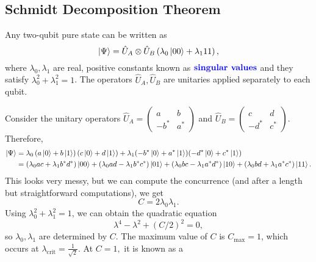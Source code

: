 \documentclass{article}
\numberwithin{equation}{section}
\begin{document}
\subsection{Schmidt Decomposition Theorem}
\begin{theorem}
    Any two-qubit pure state can be written as
    \begin{equation}
        \ket\Psi = \hat{U}_A \otimes \hat{U}_B \left(\lambda_0 \ket{00} + \lambda_1{11}\right),
    \end{equation}
    where $\lambda_0,\lambda_1$ are real, positive constants known as $\textbf{\textcolor{blue}{singular values}}$ and they satisfy $\lambda_0^2 + \lambda_1^2 = 1$. The operators $\hat{U}_A,\hat{U}_B$ are unitaries applied separately to each qubit.
\end{theorem}
Consider the unitary operators $\hat{U}_A = \begin{pmatrix}
    a & b \\ -b^* & a^*
\end{pmatrix}$ and $\hat{U}_B = \begin{pmatrix}
    c &d \\ -d^* & c^*
\end{pmatrix}.$ Therefore,
\begin{align}
    \ket\Psi &= \lambda_0\left(a\ket 0 + b\ket 1\right)(c\ket 0 + d\ket 1) + \lambda_1(-b^*\ket 0 + a^* \ket 1)(-d^*\ket 0 + c^*\ket 1) \\ 
    &= (\lambda_0 ac + \lambda_1 b^* d^*) \ket{00} + (\lambda_0 ad - \lambda_1 b^*c^*) \ket{01} + (\lambda_0 bc-\lambda_1a^*d^*)\ket{10} + (\lambda_0bd+\lambda_1a^*c^*)\ket{11}.
\end{align}
This looks very messy, but we can compute the concurrence (and after a length but straightforward computations), we get
\begin{equation}
    C = 2\lambda_0\lambda_1.
\end{equation}
Using $\lambda_0^2+\lambda_1^2=1$, we can obtain the quadratic equation
\begin{equation}
    \lambda^4 - \lambda^2 + (C/2)^2 = 0,
\end{equation}
so $\lambda_0,\lambda_1$ are determined by $C$. The maximum value of $C$ is $C_\text{max} = 1$, which occurs at $\lambda_\text{crit} = \frac{1}{\sqrt 2}.$ At $C=1,$ it is known as a 
\end{document}
